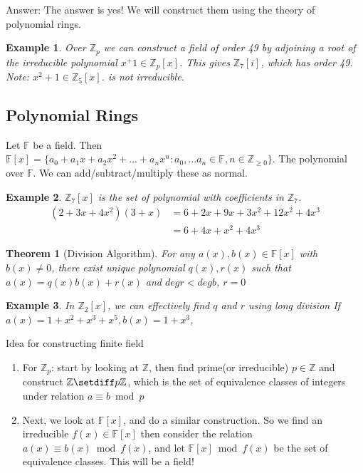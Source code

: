 \documentclass{article}
\newtheorem{thm}{Theorem}
\newtheorem{eg}{Example}
\begin{document}
Answer: The answer is yes! We will construct them using the theory of polynomial rings.

\begin{eg}
    Over $\mathbb{Z}_p$ we can construct a field of order 49 by adjoining a root of the
    irreducible polynomial $x^+1 \in \mathbb{Z}_p[x]$. This gives $\mathbb{Z}_7[i]$, which
    has order 49. Note: $x^2+1\in\mathbb{Z}_5[x]$. is not irreducible.
\end{eg}

\subsection{Polynomial Rings}
Let $\mathbb{F}$ be a field. Then
$\mathbb{F}[x] = \{a_0 + a_1x + a_2x^2 + ... + a_nx^n: a_0, ... a_n\in\mathbb{F},
n\in\mathbb{Z}_{\geq 0}\}$. The polynomial over $\mathbb{F}$.
We can add/subtract/multiply these as normal.

\begin{eg}
    $\mathbb{Z}_7[x]$ is the set of polynomial with coefficients in $\mathbb{Z}_7$.
    \begin{align*}
        (2+3x+4x^2)(3+x) &= 6 + 2x + 9x + 3x^2 + 12x^2 + 4x^3\\
        &= 6 + 4x + x^2 + 4x^3
    \end{align*}
\end{eg}

\begin{thm}[Division Algorithm]
    For any $a(x), b(x)\in\mathbb{F}[x]$ with $b(x)\ne 0$, there exist unique
    polynomial $q(x), r(x)$ such that
    $a(x) = q(x)b(x) + r(x)$ and $deg r < deg b$, $r = 0$
\end{thm}

\begin{eg}
    In $\mathbb{Z}_2[x]$, we can effectively find $q$ and $r$ using long division
    If $a(x) = 1+x^2+x^3+x^5, b(x) = 1 + x^3$,
\end{eg}

Idea for constructing finite field
\begin{enumerate}
    \item For $\mathbb{Z}_p$: start by looking at $\mathbb{Z}$, then find
        prime(or irreducible) $p\in\mathbb{Z}$ and construct
        $\mathbb{Z}\setdiff p\mathbb{Z}$, which is the set of equivalence classes
        of integers under relation $a\equiv b\bmod{p}$
    \item Next, we look at $\mathbb{F}[x]$, and do a similar construction. So we find
        an irreducible $f(x)\in\mathbb{F}[x]$ then consider the relation
        $a(x)\equiv b(x)\bmod{f(x)}$, and let $\mathbb{F}[x]\bmod{f(x)}$ be
        the set of equivalence classes. This will be a field!
\end{enumerate}
\end{document}
